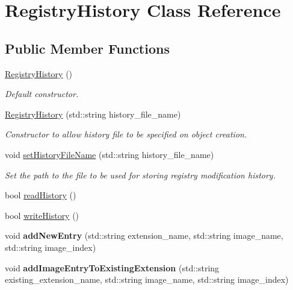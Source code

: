 \hypertarget{class_registry_history}{}\section{Registry\+History Class Reference}
\label{class_registry_history}
\subsection*{Public Member Functions}
\begin{DoxyCompactItemize}
\item 
\hypertarget{class_registry_history_ab8ca406519bf9c2383af62b655e091ec}{}\hyperlink{class_registry_history_ab8ca406519bf9c2383af62b655e091ec}{Registry\+History} ()\label{class_registry_history_ab8ca406519bf9c2383af62b655e091ec}

\begin{DoxyCompactList}\small\item\em Default constructor. \end{DoxyCompactList}\item 
\hyperlink{class_registry_history_a273475e8adc13cafd38889ef52158b9e}{Registry\+History} (std\+::string history\+\_\+file\+\_\+name)
\begin{DoxyCompactList}\small\item\em Constructor to allow history file to be specified on object creation. \end{DoxyCompactList}\item 
void \hyperlink{class_registry_history_afb10619d4c6e5b1eef4f27b11aa71ec8}{set\+History\+File\+Name} (std\+::string history\+\_\+file\+\_\+name)
\begin{DoxyCompactList}\small\item\em Set the path to the file to be used for storing registry modification history. \end{DoxyCompactList}\item 
bool \hyperlink{class_registry_history_a2a81ef9ef2d13fba16c4596a5e24409b}{read\+History} ()
\item 
bool \hyperlink{class_registry_history_ad05f552791c50a88291483544f9ffb80}{write\+History} ()
\item 
\hypertarget{class_registry_history_a698bd300223a56f854eaba6ad3dc46e3}{}void {\bfseries add\+New\+Entry} (std\+::string extension\+\_\+name, std\+::string image\+\_\+name, std\+::string image\+\_\+index)\label{class_registry_history_a698bd300223a56f854eaba6ad3dc46e3}

\item 
\hypertarget{class_registry_history_a317fd9397fe324c06087a67c403aa7b9}{}void {\bfseries add\+Image\+Entry\+To\+Existing\+Extension} (std\+::string existing\+\_\+extension\+\_\+name, std\+::string image\+\_\+name, std\+::string image\+\_\+index)\label{class_registry_history_a317fd9397fe324c06087a67c403aa7b9}

\end{DoxyCompactItemize}


